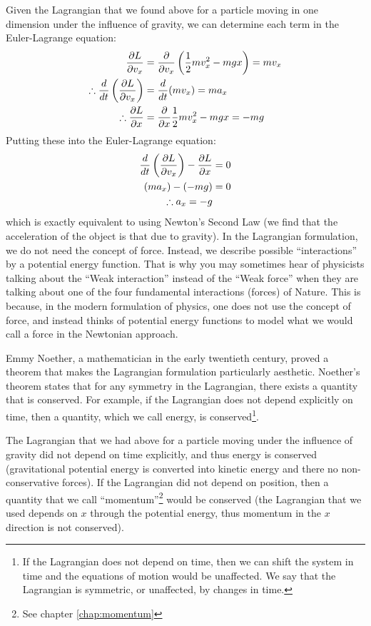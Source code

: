 Given the Lagrangian that we found above for a particle moving in one dimension under the influence of gravity, we can determine each term in the Euler-Lagrange equation:
\begin{align*}
\frac{\partial L}{\partial v_x} &= \frac{\partial }{\partial v_x}\left(\frac{1}{2}mv_x^2 - mgx \right)=mv_x\\
\therefore\frac{d}{dt}\left(\frac{\partial L}{\partial v_x}\right) &= \frac{d}{dt} (mv_x) = ma_x\\
\therefore\frac{\partial L}{\partial x}&= \frac{\partial }{\partial x}\frac{1}{2}mv_x^2 - mgx = -mg\\
\end{align*}
Putting these into the Euler-Lagrange equation:
\begin{align*}
\frac{d}{dt}\left(\frac{\partial L}{\partial v_x}\right)-\frac{\partial L}{\partial x} &= 0\\
(ma_x) - (-mg) &=0\\
\therefore a_x = -g
\end{align*}
which is exactly equivalent to using Newton's Second Law (we find that the acceleration of the object is that due to gravity). In the Lagrangian formulation, we do not need the concept of force. Instead, we describe possible ``interactions'' by a potential energy function. That is why you may sometimes hear of physicists talking about the ``Weak interaction'' instead of the ``Weak force'' when they are talking about one of the four fundamental interactions (forces) of Nature. This is because, in the modern formulation of physics, one does not use the concept of force, and instead thinks of potential energy functions to model what we would call a force in the Newtonian approach.

Emmy Noether, a mathematician in the early twentieth century, proved a theorem that makes the Lagrangian formulation particularly aesthetic. Noether's theorem states that for any symmetry in the Lagrangian, there exists a quantity that is conserved. For example, if the Lagrangian does not depend explicitly on time, then a quantity, which we call energy, is conserved\footnote{If the Lagrangian does not depend on time, then we can shift the system in time and the equations of motion would be unaffected. We say that the Lagrangian is symmetric, or unaffected, by changes in time.}. 

The Lagrangian that we had above for a particle moving under the influence of gravity did not depend on time explicitly, and thus energy is conserved (gravitational potential energy is converted into kinetic energy and there no non-conservative forces). If the Lagrangian did not depend on position, then a quantity that we call ``momentum''\footnote{See chapter \ref{chap:momentum}} would be conserved (the Lagrangian that we used depends on $x$ through the potential energy, thus momentum in the $x$ direction is not conserved). 


